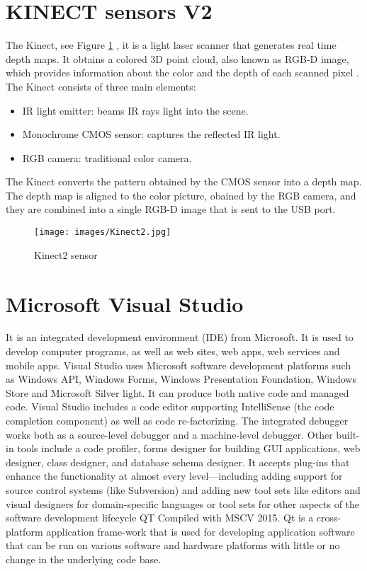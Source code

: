 \documentclass[a4paper]{report}
\begin{document}
\section{KINECT sensors V2}
The Kinect, see Figure \ref{Kinect2} , it is a light laser scanner that generates real time depth maps. It obtains a colored 3D point cloud, also known as RGB-D image, which provides information about the color and the depth of each scanned pixel \cite{ref6}.
The Kinect consists of three main elements:
\begin{itemize}
\item IR light emitter: beams IR rays light into the scene.
\item Monochrome CMOS sensor: captures the reflected IR light.
\item RGB camera: traditional color camera.
\end{itemize}
The Kinect converts the pattern obtained by the CMOS sensor into a depth map. The depth map is aligned to the color picture, obained by the RGB camera, and they are combined into a single RGB-D image that is sent to the USB port. \cite{ref7}
\begin{center}
\begin{figure}[h]
\texttt{[image: images/Kinect2.jpg]}
\caption{Kinect2 sensor}
\label{Kinect2}
\end{figure}
\end{center}

\section{Microsoft Visual Studio}
It is an integrated development environment (IDE) from Microsoft. It is used to develop computer programs, as well as web sites, web apps, web services and mobile apps. Visual Studio uses Microsoft software development platforms such as Windows API, Windows Forms, Windows Presentation Foundation, Windows Store and Microsoft Silver light. It can produce both native code and managed code. Visual Studio includes a code editor supporting IntelliSense (the code completion component) as well as code re-factorizing. The integrated debugger works both as a source-level debugger and a machine-level debugger. Other built-in tools include a code profiler, forms designer for building GUI applications, web designer, class designer, and database schema designer. It accepts plug-ins that enhance the functionality at almost every level—including adding support for source control systems (like Subversion) and adding new tool sets like editors and visual designers for domain-specific languages or tool sets for other aspects of the software development lifecycle QT Compiled with MSCV 2015. Qt is a cross-platform application frame-work that is used for developing application software that can be run on various software and hardware platforms with little or no change in the underlying code base. 
\end{document}
